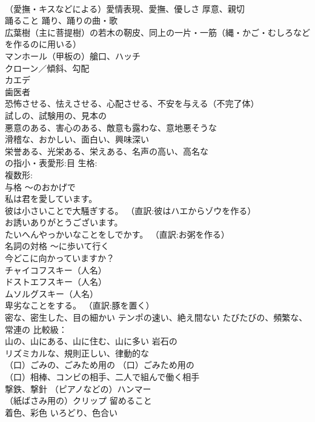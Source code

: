 \documentclass[8pt]{extreport}
\begin{document}
\begin{CJK}{UTF8}{min}
\\	（愛撫・キスなどによる）愛情表現、愛撫、優しさ 厚意、親切
\\	踊ること 踊り、踊りの曲・歌
\\	広葉樹（主に菩提樹）の若木の靭皮、同上の一片・一筋（縄・かご・むしろなどを作るのに用いる）
\\	マンホール（甲板の）艙口、ハッチ
\\	クローン／傾斜、勾配
\\	カエデ
\\	歯医者
\\	恐怖させる、怯えさせる、心配させる、不安を与える（不完了体）
\\	試しの、試験用の、見本の
\\	悪意のある、害心のある、敵意も露わな、意地悪そうな 
\\	滑稽な、おかしい、面白い、興味深い 
\\	栄誉ある、光栄ある、栄えある、名声の高い、高名な
\\	の指小・表愛形:目 生格:
\\	複数形:
\\	与格	〜のおかげで
\\	私は君を愛しています。
\\	彼は小さいことで大騒ぎする。 （直訳:彼はハエからゾウを作る）
\\	お誘いありがとうございます。
\\	たいへんやっかいなことをしでかす。 （直訳:お粥を作る）
\\	名詞の対格	〜に歩いて行く
\\	今どこに向かっていますか？
\\	チャイコフスキー（人名）
\\	ドストエフスキー（人名）
\\	ムソルグスキー（人名）
\\	卑劣なことをする。 （直訳:豚を置く）
\\	密な、密生した、目の細かい テンポの速い、絶え間ない たびたびの、頻繁な、常連の 比較級：
\\	山の、山にある、山に住む、山に多い 岩石の
\\	リズミカルな、規則正しい、律動的な
\\	（口）ごみの、ごみため用の （口）ごみため用の
\\	（口）相棒、コンビの相手、二人で組んで働く相手
\\	撃鉄、撃針 （ピアノなどの）ハンマー
\\	（紙ばさみ用の）クリップ 留めること
\\	着色、彩色 いろどり、色合い

\end{CJK}
\end{document}

